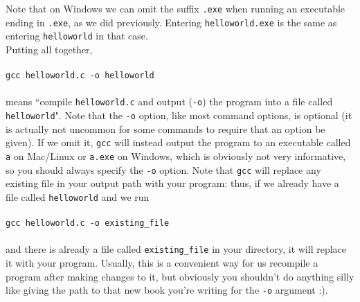 \documentclass{article}
\begin{document}
Note that on Windows we can omit the suffix \verb|.exe| when running an executable ending in \verb|.exe|, as we did
previously. Entering \verb|helloworld.exe| is the same as entering \verb|helloworld| in that case. \\
Putting all together, \\ \\
\verb|gcc helloworld.c -o helloworld| \\ \\
means ``compile \verb|helloworld.c| and output (\verb|-o|) the program into a file called \verb|helloworld|". Note that
the \verb|-o| option, like most command options, is optional (it is actually not uncommon for some commands to require
that an option be given). If we omit it, \verb|gcc| will instead output the program to an executable called \verb|a|
on Mac/Linux or \verb|a.exe| on Windows, which is obviously not very informative, so you should always specify the
\verb|-o| option. Note that \verb|gcc| will replace any existing file in your output path with your program: thus,
if we already have a file called \verb|helloworld| and we run \\ \\
\verb|gcc helloworld.c -o existing_file| \\ \\
and there is already a file called \verb|existing_file| in your directory, it will replace it with your program.
Usually, this is a convenient way for us recompile a program after making changes to it, but obviously you shouldn't
do anything silly like giving the path to that new book you're writing for the \verb|-o| argument :). \\ \\
\end{document}
